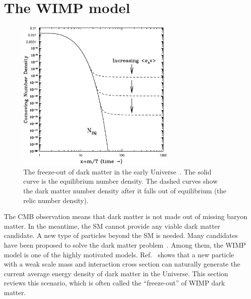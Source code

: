 \documentclass[doublespace,nopageskip]{VTthesis} %
\begin{document}
\section{The WIMP model}\label{se:wimp}

\begin{figure}[htb]
    \centering
    \includegraphics[width=0.7\textwidth]{Figures/Intro/freezeout.ps}
    \caption{The freeze-out of dark matter in the early Universe~\cite{2009arXiv0901.4090H}. The solid curve is the equilibrium number density. The dashed curves show the dark matter number density after it falls out of equilibrium (the relic number density).}
    \label{fig:freeze-out}
\end{figure}

The CMB observation means that dark matter is not made out of missing baryon matter. In the meantime, the SM cannot provide any viable dark matter candidate. A new type of particles beyond the SM is needed.  Many candidates have been proposed to solve the dark matter problem~\cite{2005PhR...405..279B}. Among them, the WIMP model is one of the highly motivated models. Ref.~\cite{1979ARNPS..29..313S} shows that a new particle with a weak scale mass and interaction cross section can naturally generate the current average energy density of dark matter in the Universe. This section reviews this scenario, which is often called the ``freeze-out'' of WIMP dark matter.
\end{document}

